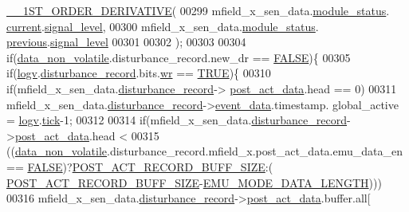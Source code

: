 \begin{DoxyCode}
      \hyperlink{a00021_ac57756fe3d634c3c5a1af000271d40e5}{\_\_1ST\_ORDER\_DERIVATIVE}(
00299                                             mfield\_x\_sen\_data.\hyperlink{a00025_adfab5a5d8b45a93dfb13edb24e2b80e3}{module\_status}.
      \hyperlink{a00019_acf41ffc11da291c2f9f0fcb02ee72b98}{current}.\hyperlink{a00019_a4070db8eab0ff93e3fbc1df59872f117}{signal\_level},
00300                                             mfield\_x\_sen\_data.\hyperlink{a00025_adfab5a5d8b45a93dfb13edb24e2b80e3}{module\_status}.
      \hyperlink{a00019_adcb859b2f3983a9c58deab28e59c333f}{previous}.\hyperlink{a00019_a4070db8eab0ff93e3fbc1df59872f117}{signal\_level}
00301 
00302                                             );
00303 
00304     \textcolor{keywordflow}{if}(\hyperlink{a00060_a76ac5f917f5308dcd83de0d7c94559fb}{data\_non\_volatile}.disturbance\_record.new\_dr == \hyperlink{a00040_aa93f0eb578d23995850d61f7d61c55c1}{FALSE})\{
00305     \textcolor{keywordflow}{if}(\hyperlink{a00021_a2e89c46668b39a17753c238950c9e1ec}{logv}.\hyperlink{a00021_a11ed024c2cc5c53c79b2c0a8b35e3c06}{disturbance\_record}.bits.\hyperlink{a00021_a11ea0eda9ab27873198e7a5c4be4337d}{wr} == \hyperlink{a00040_aa8cecfc5c5c054d2875c03e77b7be15d}{TRUE})\{
00310           \textcolor{keywordflow}{if}(mfield\_x\_sen\_data.\hyperlink{a00025_ac9b38e2c1d3f1013a88d33506c754152}{disturbance\_record}->
      \hyperlink{a00028_a9c699c0cc82d0baa6e49195f185ab34f}{post\_act\_data}.head == 0)
00311             mfield\_x\_sen\_data.\hyperlink{a00025_ac9b38e2c1d3f1013a88d33506c754152}{disturbance\_record}->\hyperlink{a00028_a8c0bda69e71ef674e60da47ad0be9ab0}{event\_data}.timestamp.
      global\_active = \hyperlink{a00021_a2e89c46668b39a17753c238950c9e1ec}{logv}.\hyperlink{a00021_a81f0ce68c2c483fb8df726cc1988d8e8}{tick}-1;
00312 
00314       \textcolor{keywordflow}{if}(mfield\_x\_sen\_data.\hyperlink{a00025_ac9b38e2c1d3f1013a88d33506c754152}{disturbance\_record}->\hyperlink{a00028_a9c699c0cc82d0baa6e49195f185ab34f}{post\_act\_data}.head <
00315         ((\hyperlink{a00060_a76ac5f917f5308dcd83de0d7c94559fb}{data\_non\_volatile}.disturbance\_record.mfield\_x.post\_act\_data.emu\_data\_en==
      \hyperlink{a00040_aa93f0eb578d23995850d61f7d61c55c1}{FALSE})?\hyperlink{a00022_ab1ad440de86fff80e517ad748de2ee39}{POST\_ACT\_RECORD\_BUFF\_SIZE}:(
      \hyperlink{a00022_ab1ad440de86fff80e517ad748de2ee39}{POST\_ACT\_RECORD\_BUFF\_SIZE}-\hyperlink{a00022_af4c3a8ad94feb4d7bda7f107f34baf41}{EMU\_MODE\_DATA\_LENGTH})))
00316         mfield\_x\_sen\_data.\hyperlink{a00025_ac9b38e2c1d3f1013a88d33506c754152}{disturbance\_record}->\hyperlink{a00028_a9c699c0cc82d0baa6e49195f185ab34f}{post\_act\_data}.buffer.all[

\end{DoxyCode}
